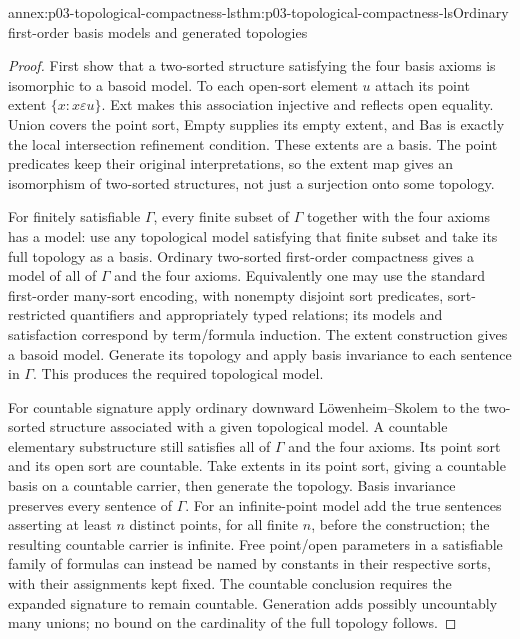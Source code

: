 \begin{annexitem}{annex:p03-topological-compactness-ls}{thm:p03-topological-compactness-ls}{Ordinary first-order basis models and generated topologies}
\begin{proof}
First show that a two-sorted structure satisfying the four basis axioms is
isomorphic to a basoid model. To each open-sort element \(u\) attach its
point extent \(\{x:x\varepsilon u\}\). Ext makes this association
injective and reflects open equality. Union covers the point sort, Empty
supplies its empty extent, and Bas is exactly the local intersection
refinement condition. These extents are a basis. The point predicates keep
their original interpretations, so the extent map gives an isomorphism of
two-sorted structures, not just a surjection onto some topology.

For finitely satisfiable \(\Gamma\), every finite subset of
\(\Gamma\) together with the four axioms has a model: use any
topological model satisfying that finite subset and take its full topology
as a basis. Ordinary two-sorted first-order compactness gives a model of
all of \(\Gamma\) and the four axioms. Equivalently one may use the
standard first-order many-sort encoding, with nonempty disjoint sort
predicates, sort-restricted quantifiers and appropriately typed relations;
its models and satisfaction correspond by term/formula induction.
The extent construction gives a basoid model. Generate its topology and
apply basis invariance to each sentence in \(\Gamma\). This produces
the required topological model.

For countable signature apply ordinary downward L\"owenheim--Skolem to
the two-sorted structure associated with a given topological model. A
countable elementary substructure still satisfies all of \(\Gamma\)
and the four axioms. Its point sort and its open sort are countable.
Take extents in its point sort, giving a countable basis on a countable
carrier, then generate the topology. Basis invariance preserves every
sentence of \(\Gamma\). For an infinite-point model add the true
sentences asserting at least \(n\) distinct points, for all finite \(n\),
before the construction; the resulting countable carrier is infinite.
Free point/open parameters in a satisfiable family of formulas can instead
be named by constants in their respective sorts, with their assignments
kept fixed. The countable conclusion requires the expanded signature to
remain countable. Generation adds possibly uncountably many unions; no
bound on the cardinality of the full topology follows.
\end{proof}
\end{annexitem}

